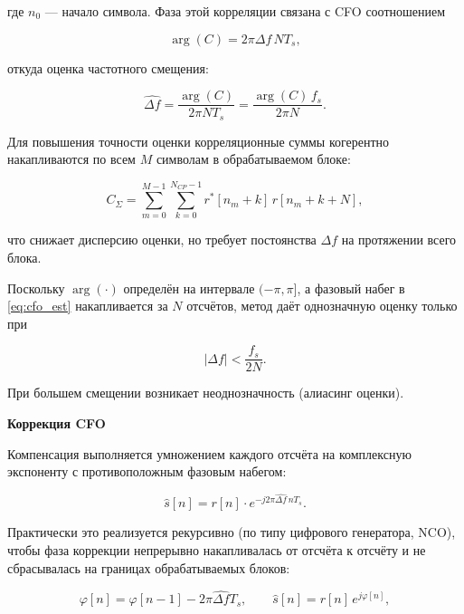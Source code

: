 где $n_0$ — начало символа. Фаза этой корреляции связана с CFO
соотношением

\begin{equation}
    \arg(C) = 2\pi \Delta f \, N T_s,
\end{equation}

откуда оценка частотного смещения:

\begin{equation}
    \hat{\Delta f} = \frac{\arg(C)}{2\pi N T_s} = \frac{\arg(C)\, f_s}{2\pi N}.
    \label{eq:cfo_est}
\end{equation}

Для повышения точности оценки корреляционные суммы когерентно
накапливаются по всем $M$ символам в обрабатываемом блоке:

\begin{equation}
    C_{\Sigma} = \sum_{m=0}^{M-1} \sum_{k=0}^{N_{CP}-1}
        r^{*}[n_m + k]\, r[n_m + k + N],
\end{equation}

что снижает дисперсию оценки, но требует постоянства $\Delta f$ на
протяжении всего блока.

Поскольку $\arg(\cdot)$ определён на интервале $(-\pi, \pi]$, а фазовый
набег в \eqref{eq:cfo_est} накапливается за $N$ отсчётов, метод даёт
однозначную оценку только при

\begin{equation}
    |\Delta f| < \frac{f_s}{2N}.
\end{equation}

При большем смещении возникает неоднозначность (алиасинг оценки).

\vspace{20pt}

\textbf{Коррекция CFO}\newline

Компенсация выполняется умножением каждого отсчёта на комплексную
экспоненту с противоположным фазовым набегом:

\begin{equation}
    \hat{s}[n] = r[n] \cdot e^{-j2\pi \hat{\Delta f}\, n T_s}.
\end{equation}

Практически это реализуется рекурсивно (по типу цифрового генератора,
NCO), чтобы фаза коррекции непрерывно накапливалась от отсчёта к отсчёту
и не сбрасывалась на границах обрабатываемых блоков:

\begin{equation}
    \varphi[n] = \varphi[n-1] - 2\pi \hat{\Delta f} T_s,
    \qquad
    \hat{s}[n] = r[n]\, e^{j\varphi[n]},
\end{equation}

